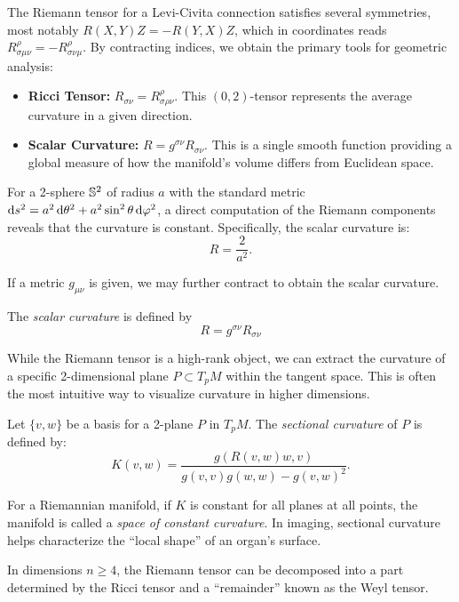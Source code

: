 The Riemann tensor for a Levi-Civita connection satisfies several symmetries, most notably $R(X,Y)Z = -R(Y,X)Z$, which in coordinates reads $R^\rho_{\sigma\mu\nu} = -R^\rho_{\sigma\nu\mu}$. By contracting indices, we obtain the primary tools for geometric analysis:
\begin{itemize}
  \item \textbf{Ricci Tensor:} $R_{\sigma\nu} = R^\rho_{\sigma\rho\nu}$. This $(0,2)$-tensor represents the average curvature in a given direction.
  \item \textbf{Scalar Curvature:} $R = g^{\sigma\nu} R_{\sigma\nu}$. This is a single smooth function providing a global measure of how the manifold's volume differs from Euclidean space.
\end{itemize}

\begin{example}
  For a 2-sphere $\S^2$ of radius $a$ with the standard metric $\ds^2 = a^2 \dd{\theta}^2 + a^2 \sin^2 \theta \dd{\phi}^2$, a direct computation of the Riemann components reveals that the curvature is constant. Specifically, the scalar curvature is:
  \[%
    R = \frac{2}{a^2}
  .\]%
\end{example}

If a metric $g_{\mu\nu}$ is given, we may further contract to obtain the scalar curvature.

\begin{definition}
  The \emph{scalar curvature} is defined by
  \[%
    R = g^{\sigma\nu} R_{\sigma\nu}
  \]%
\end{definition}

While the Riemann tensor is a high-rank object, we can extract the curvature of a specific 2-dimensional plane $P \subset T_pM$ within the tangent space. This is often the most intuitive way to visualize curvature in higher dimensions.

\begin{definition}
  Let $\{v, w\}$ be a basis for a 2-plane $P$ in $T_pM$. The \emph{sectional curvature} of $P$ is defined by:
  \[%
    K(v,w) = \frac{g(R(v,w)w, v)}{g(v,v)g(w,w) - g(v,w)^2}
  .\]%
\end{definition}

For a Riemannian manifold, if $K$ is constant for all planes at all points, the manifold is called a \emph{space of constant curvature}. In imaging, sectional curvature helps characterize the ``local shape'' of an organ's surface.

In dimensions $n \geq 4$, the Riemann tensor can be decomposed into a part determined by the Ricci tensor and a ``remainder'' known as the Weyl tensor.


